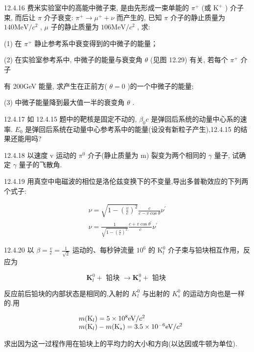 \begin{problem}{12.4.16}
费米实验室中的高能中微子束, 是由先形成一束单能的 $\pi^{+}$ (或 $\mathrm{K}^{+}$ ) 介子束, 而后让 $\pi$ 介子衰变: $\pi^{+} \rightarrow \mu^{+} + \nu$ 而产生的, 已知 $\pi$ 介子的静止质量为 $140\mathrm{MeV} / c^2$ , $\mu$ 子的静止质量为 $106\mathrm{MeV} / c^2$ , 求:

(1) 在 $\pi^{+}$ 静止参考系中衰变得到的中微子的能量；

(2) 在实验室参考系中, 中微子的能量与衰变角 $\theta$ (见图 12.29) 有关, 若每个 $\pi^{+}$ 介子

有 200GeV 能量, 求产生在正前方( $\theta=0$ )的一个中微子的能量;

(3) 中微子能量降到最大值一半的衰变角 $\theta$ .
\begin{center}

\end{center}
\end{problem}
\clearpage


\begin{problem}{12.4.17}
如 12.4.15 题中的靶核是固定不动的, $\beta_{0}c$ 是弹回后系统的动量中心系的速率. $E_{0}$ 是弹回后系统在动量中心参考系中的能量(设没有新粒子产生),12.4.15 的结果还能用吗?
\end{problem}
\clearpage


\begin{problem}{12.4.18}
以速度 v 运动的 $\pi^{0}$ 介子(静止质量为 m) 裂变为两个相同的 $\gamma$ 量子, 试确定 $\gamma$ 量子的飞散角.
\end{problem}
\clearpage


\begin{problem}{12.4.19}
用真空中电磁波的相位是洛伦兹变换下的不变量,导出多普勒效应的下列两个式子:

\[
\begin{array}{l} \nu = \sqrt {1 - \left(\frac {v}{c}\right) ^ {2}} \frac {c}{c - v \cos \theta} \nu^ {\prime} \\ \nu = \frac {1}{\sqrt {1 - \left(\frac {v}{c}\right) ^ {2}}} \frac {c + v \cos \theta^ {\prime}}{c} \nu^ {\prime} \end{array}
\]
\end{problem}
\clearpage


\begin{problem}{12.4.20}
以 $\beta = \frac{v}{c} = \frac{1}{\sqrt{2}}$ 运动的、每秒钟流量 $10^{6}$ 的 $\mathrm{K}_l^0$ 介子束与铅块相互作用，反应为

\[
\mathbf {K} _ {l} ^ {0} + \text { 铅块 } \rightarrow \mathbf {K} _ {s} ^ {0} + \text { 铅块 }
\]

反应前后铅块的内部状态是相同的,入射的 $K_{l}^{0}$ 与出射的 $K_{s}^{0}$ 的运动方向也是一样的.用

\[
\begin{array}{r l} & m (\mathrm{K} _ {l}) = 5 \times 1 0 ^ {8} \mathrm{eV} / c ^ {2} \\ & m (\mathrm{K} _ {l}) - m (\mathrm{K} _ {s}) = 3. 5 \times 1 0 ^ {- 6} \mathrm{eV} / c ^ {2} \end{array}
\]

求出因为这一过程作用在铅块上的平均力的大小和方向(以达因或牛顿为单位).
\end{problem}
\clearpage


